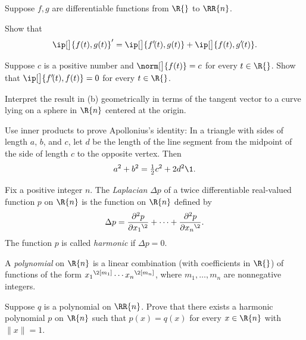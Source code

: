 \exercise
Suppose $f, g$ are differentiable functions from $\R{}$ to $\RR{n}$.
\begin{subtheorem}
\item
Show that
\[
\ip[\big]{ f(t), g(t) }' = \ip[\big]{ f' \! (t), g(t)} + \ip[\big]{f(t), g' \! (t) }.
\]
\item
Suppose $c$ is a positive number and $\norm[\big]{f(t)} = c$ for every $t \in \R{}$. Show that $\ip[\big]{ f' \! (t), f(t) } = 0$ for every $t \in \R{}$.
\item
Interpret the result in (b) geometrically in terms of the tangent vector to a curve lying on a sphere in $\R{n}$ centered at the origin.
\end{subtheorem}


\exercise
Use inner products to prove Apollonius's identity: In a triangle with sides of length $a$, $b$, and $c$, let $d$ be the length of the line segment from the midpoint of the side of length $c$ to the opposite vertex. Then \label{Apollonius}
\[
a^2 + b^2 = \tfrac{1}{2} c^2 + 2d^2\1.
\]
\vspace{-.45in}


\exercise
Fix a positive integer $n$. The \emph{Laplacian} $\Delta p$ of a twice differentiable real-valued function $p$ on $\R{n}$ is the function on $\R{n}$ defined by \label{harmonic}
\[
\Delta p = \frac{ \partial^2 p }{\partial {x_1}^{\2}} + \dots + \frac{ \partial^2 p }{\partial {x_n}^{\2}}.
\]
The function $p$ is called \emph{harmonic} if $\Delta p = 0$.

A \emph{polynomial} on $\R{n}$ is a linear combination (with coefficients in $\R{}$) of functions of the form
${x_1}^{\2[m_1]} \dotsm {x_n}^{\2[m_n]}$, where $m_1, \dots, m_n$ are nonnegative integers.

Suppose $q$ is a polynomial on $\RR{n}$. Prove that there exists a harmonic polynomial $p$ on $\R{n}$ such that $p(x) = q(x)$ for every $x \in \R{n}$ with $\|x\| = 1$.


